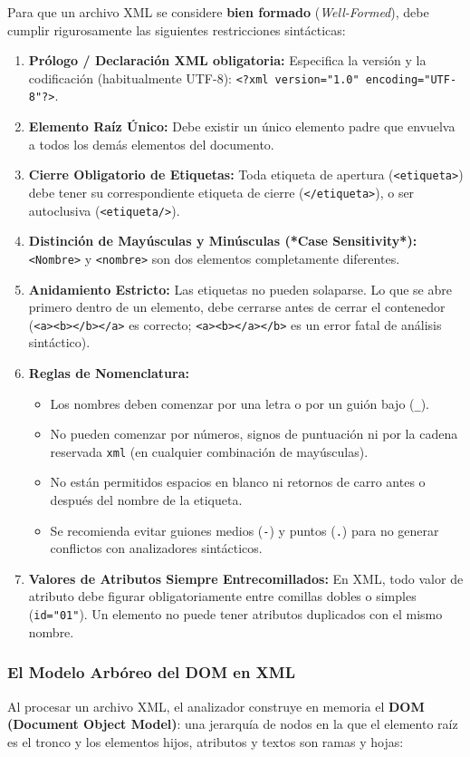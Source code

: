 Para que un archivo XML se considere \textbf{bien formado} (\textit{Well-Formed}), debe cumplir rigurosamente las siguientes restricciones sintácticas:
\begin{enumerate}
  \item \textbf{Prólogo / Declaración XML obligatoria:} Especifica la versión y la codificación (habitualmente UTF-8): \texttt{<?xml version="1.0" encoding="UTF-8"?>}.
  \item \textbf{Elemento Raíz Único:} Debe existir un único elemento padre que envuelva a todos los demás elementos del documento.
  \item \textbf{Cierre Obligatorio de Etiquetas:} Toda etiqueta de apertura (\texttt{<etiqueta>}) debe tener su correspondiente etiqueta de cierre (\texttt{</etiqueta>}), o ser autoclusiva (\texttt{<etiqueta/>}).
  \item \textbf{Distinción de Mayúsculas y Minúsculas (*Case Sensitivity*):} \texttt{<Nombre>} y \texttt{<nombre>} son dos elementos completamente diferentes.
  \item \textbf{Anidamiento Estricto:} Las etiquetas no pueden solaparse. Lo que se abre primero dentro de un elemento, debe cerrarse antes de cerrar el contenedor (\texttt{<a><b></b></a>} es correcto; \texttt{<a><b></a></b>} es un error fatal de análisis sintáctico).
  \item \textbf{Reglas de Nomenclatura:}
    \begin{itemize}
      \item Los nombres deben comenzar por una letra o por un guión bajo (\texttt{\_}).
      \item No pueden comenzar por números, signos de puntuación ni por la cadena reservada \texttt{xml} (en cualquier combinación de mayúsculas).
      \item No están permitidos espacios en blanco ni retornos de carro antes o después del nombre de la etiqueta.
      \item Se recomienda evitar guiones medios (\texttt{-}) y puntos (\texttt{.}) para no generar conflictos con analizadores sintácticos.
    \end{itemize}
  \item \textbf{Valores de Atributos Siempre Entrecomillados:} En XML, todo valor de atributo debe figurar obligatoriamente entre comillas dobles o simples (\texttt{id="01"}). Un elemento no puede tener atributos duplicados con el mismo nombre.
\end{enumerate}

\subsubsection{El Modelo Arbóreo del DOM en XML}
Al procesar un archivo XML, el analizador construye en memoria el \textbf{DOM (Document Object Model)}: una jerarquía de nodos en la que el elemento raíz es el tronco y los elementos hijos, atributos y textos son ramas y hojas:

